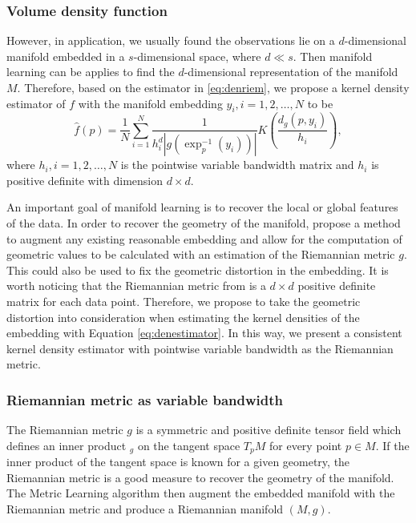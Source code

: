 \documentclass[11pt,a4paper,]{article}
\begin{document}
\hypertarget{volume-density-function}{%
\subsubsection{Volume density function}\label{volume-density-function}}

However, in application, we usually found the observations lie on a \(d\)-dimensional manifold embedded in a \(s\)-dimensional space, where \(d \ll s\). Then manifold learning can be applies to find the \(d\)-dimensional representation of the manifold \(M\). Therefore, based on the estimator in \eqref{eq:denriem}, we propose a kernel density estimator of \(f\) with the manifold embedding \(y_i, i = 1, 2, \dots, N\) to be
\begin{equation}
\label{eq:denestimator}
\hat{f}(p) = \frac{1}{N} \sum_{i=1}^{N} \frac{1}{h_i^d |g(\exp_p^{-1}(y_i))|} K(\frac{d_g(p, y_i)}{h_i}),
\end{equation}
where \(h_i, i = 1, 2, \dots, N\) is the pointwise variable bandwidth matrix and \(h_i\) is positive definite with dimension \(d\times d\).

An important goal of manifold learning is to recover the local or global features of the data. In order to recover the geometry of the manifold, \textcite{Perrault-Joncas2013-pq} propose a method to augment any existing reasonable embedding and allow for the computation of geometric values to be calculated with an estimation of the Riemannian metric \(g\). This could also be used to fix the geometric distortion in the embedding. It is worth noticing that the Riemannian metric from \textcite{Perrault-Joncas2013-pq} is a \(d\times d\) positive definite matrix for each data point. Therefore, we propose to take the geometric distortion into consideration when estimating the kernel densities of the embedding with Equation \eqref{eq:denestimator}. In this way, we present a consistent kernel density estimator with pointwise variable bandwidth as the Riemannian metric.

\hypertarget{riemannian-metric-as-variable-bandwidth}{%
\subsubsection{Riemannian metric as variable bandwidth}\label{riemannian-metric-as-variable-bandwidth}}

The Riemannian metric \(g\) is a symmetric and positive definite tensor field which defines an inner product \(<,>_g\) on the tangent space \(T_pM\) for every point \(p \in M\). If the inner product of the tangent space is known for a given geometry, the Riemannian metric is a good measure to recover the geometry of the manifold. The Metric Learning algorithm \autocite{Perrault-Joncas2013-pq} then augment the embedded manifold with the Riemannian metric and produce a Riemannian manifold \((M, g)\).
\end{document}
